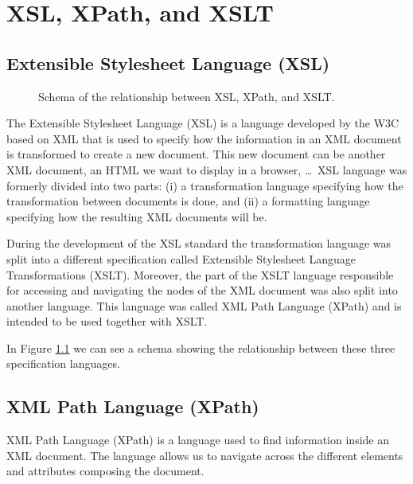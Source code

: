 \chapter{XSL, XPath, and XSLT}\label{a1}

\section{Extensible Stylesheet Language (XSL)}\label{XSL}

\begin{figure}[h]
\begin{center}
\end{center}
\caption{Schema of the relationship between XSL, XPath, and XSLT.}
\label{FigureA1}
\end{figure}

The Extensible Stylesheet Language (XSL) \cite{W3C2006} is a language developed by the W3C based on XML that is used to specify how the information in an XML document is transformed to create a new document. This new document can be another XML document, an HTML we want to display in a browser, \ldots\ XSL language was formerly divided into two parts: (i) a transformation language specifying how the transformation between documents is done, and (ii) a formatting language specifying how the resulting XML documents will be.

During the development of the XSL standard the transformation language was split into a different specification called Extensible Stylesheet Language Transformations (XSLT). Moreover, the part of the XSLT language responsible for accessing and navigating the nodes of the XML document was also split into another language. This language was called XML Path Language (XPath) and is intended to be used together with XSLT.

In Figure \ref{FigureA1} we can see a schema showing the relationship between these three specification languages.

\section{XML Path Language (XPath)}\label{XPath}

XML Path Language (XPath) \cite{W3C1999} is a language used to find information inside an XML document. The language allows us to navigate across the different elements and attributes composing the document.

